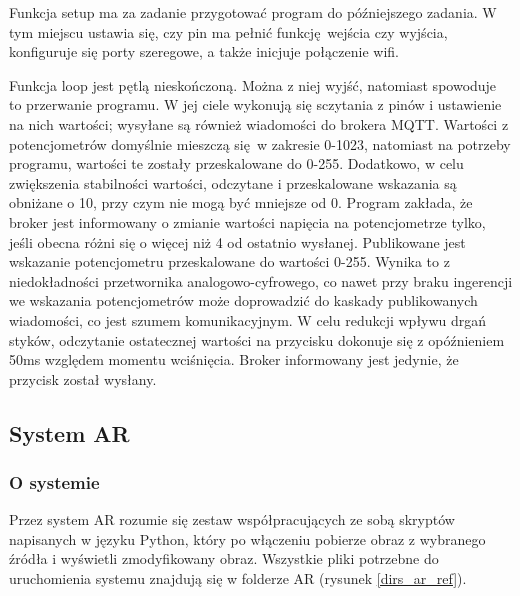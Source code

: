 \documentclass[12pt,twoside,polish]{article}
\begin{document}

Funkcja setup ma za zadanie przygotować program do późniejszego zadania. W tym miejscu ustawia się, czy pin ma pełnić funkcję wejścia czy wyjścia, konfiguruje się porty szeregowe, a także inicjuje połączenie wifi.


Funkcja loop jest pętlą nieskończoną. Można z niej wyjść, natomiast spowoduje to przerwanie programu. W jej ciele wykonują się sczytania z pinów i ustawienie na nich wartości; wysyłane są również wiadomości do brokera MQTT. Wartości z potencjometrów domyślnie mieszczą się w zakresie 0-1023, natomiast na potrzeby programu, wartości te zostały przeskalowane do 0-255. Dodatkowo, w celu zwiększenia stabilności wartości, odczytane i przeskalowane wskazania są obniżane o 10, przy czym nie mogą być mniejsze od 0. Program zakłada, że broker jest informowany o zmianie wartości napięcia na potencjometrze tylko, jeśli obecna różni się o więcej niż 4 od ostatnio wysłanej. Publikowane jest wskazanie potencjometru przeskalowane do wartości 0-255. Wynika to z niedokładności przetwornika analogowo-cyfrowego, co nawet przy braku ingerencji we wskazania potencjometrów może doprowadzić do kaskady publikowanych wiadomości, co jest szumem komunikacyjnym. W celu redukcji wpływu drgań styków, odczytanie ostatecznej wartości na przycisku dokonuje się z opóźnieniem 50ms względem momentu wciśnięcia. Broker informowany jest jedynie, że przycisk został wysłany.



\subsection{System AR}
\subsubsection*{O systemie}
Przez system AR rozumie się zestaw współpracujących ze sobą skryptów napisanych w języku Python, który po włączeniu pobierze obraz z wybranego źródła i wyświetli zmodyfikowany obraz. Wszystkie pliki potrzebne do uruchomienia systemu znajdują się w folderze AR (rysunek \ref{dirs_ar_ref}). 
\end{document}
